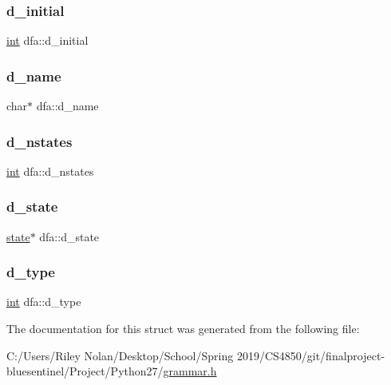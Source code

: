 \subsubsection{\texorpdfstring{d\_initial}{d\_initial}}
{\footnotesize\ttfamily \mbox{\hyperlink{warnings_8h_a74f207b5aa4ba51c3a2ad59b219a423b}{int}} dfa\+::d\+\_\+initial}

\mbox{\label{structdfa_a714ab213ebbb5228584fe7593399e038}} 
\subsubsection{\texorpdfstring{d\_name}{d\_name}}
{\footnotesize\ttfamily char$\ast$ dfa\+::d\+\_\+name}

\mbox{\label{structdfa_ab53253e48bbb638e9bb9cb9ca744004b}} 
\subsubsection{\texorpdfstring{d\_nstates}{d\_nstates}}
{\footnotesize\ttfamily \mbox{\hyperlink{warnings_8h_a74f207b5aa4ba51c3a2ad59b219a423b}{int}} dfa\+::d\+\_\+nstates}

\mbox{\label{structdfa_aa70e502038acab62cce1c115f71cba7b}} 
\subsubsection{\texorpdfstring{d\_state}{d\_state}}
{\footnotesize\ttfamily \mbox{\hyperlink{structstate}{state}}$\ast$ dfa\+::d\+\_\+state}

\mbox{\label{structdfa_a69ef1e4934ea32fd079f99bcd8018946}} 
\subsubsection{\texorpdfstring{d\_type}{d\_type}}
{\footnotesize\ttfamily \mbox{\hyperlink{warnings_8h_a74f207b5aa4ba51c3a2ad59b219a423b}{int}} dfa\+::d\+\_\+type}



The documentation for this struct was generated from the following file\+:\begin{DoxyCompactItemize}
\item 
C\+:/\+Users/\+Riley Nolan/\+Desktop/\+School/\+Spring 2019/\+C\+S4850/git/finalproject-\/bluesentinel/\+Project/\+Python27/\mbox{\hyperlink{grammar_8h}{grammar.\+h}}\end{DoxyCompactItemize}
